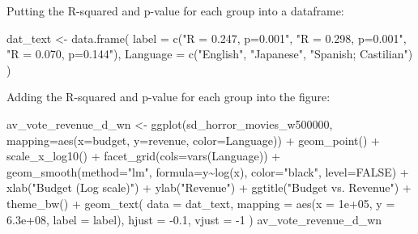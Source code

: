 \documentclass[
]{article}
\newenvironment{Shaded}{\begin{snugshade}}{\end{snugshade}}
\newcommand{\AttributeTok}[1]{\textcolor[rgb]{0.77,0.63,0.00}{#1}}
\newcommand{\ConstantTok}[1]{\textcolor[rgb]{0.00,0.00,0.00}{#1}}
\newcommand{\DecValTok}[1]{\textcolor[rgb]{0.00,0.00,0.81}{#1}}
\newcommand{\FloatTok}[1]{\textcolor[rgb]{0.00,0.00,0.81}{#1}}
\newcommand{\FunctionTok}[1]{\textcolor[rgb]{0.00,0.00,0.00}{#1}}
\newcommand{\NormalTok}[1]{#1}
\newcommand{\OtherTok}[1]{\textcolor[rgb]{0.56,0.35,0.01}{#1}}
\newcommand{\SpecialCharTok}[1]{\textcolor[rgb]{0.00,0.00,0.00}{#1}}
\newcommand{\StringTok}[1]{\textcolor[rgb]{0.31,0.60,0.02}{#1}}
\begin{document}
Putting the R-squared and p-value for each group into a dataframe:

\begin{Shaded}
\begin{Highlighting}[]
\NormalTok{dat\_text }\OtherTok{\textless{}{-}} \FunctionTok{data.frame}\NormalTok{(}
  \AttributeTok{label =} \FunctionTok{c}\NormalTok{(}\StringTok{"R = 0.247, p=0.001"}\NormalTok{, }\StringTok{"R = 0.298, p=0.001"}\NormalTok{, }\StringTok{"R = 0.070, p=0.144"}\NormalTok{),}
  \AttributeTok{Language   =} \FunctionTok{c}\NormalTok{(}\StringTok{"English"}\NormalTok{, }\StringTok{"Japanese"}\NormalTok{, }\StringTok{"Spanish; Castilian"}\NormalTok{)}
\NormalTok{)}
\end{Highlighting}
\end{Shaded}

Adding the R-squared and p-value for each group into the figure:

\begin{Shaded}
\begin{Highlighting}[]
\NormalTok{av\_vote\_revenue\_d\_wn }\OtherTok{\textless{}{-}} \FunctionTok{ggplot}\NormalTok{(sd\_horror\_movies\_w500000, }\AttributeTok{mapping=}\FunctionTok{aes}\NormalTok{(}\AttributeTok{x=}\NormalTok{budget, }\AttributeTok{y=}\NormalTok{revenue, }\AttributeTok{color=}\NormalTok{Language)) }\SpecialCharTok{+} \FunctionTok{geom\_point}\NormalTok{() }\SpecialCharTok{+} \FunctionTok{scale\_x\_log10}\NormalTok{() }\SpecialCharTok{+} \FunctionTok{facet\_grid}\NormalTok{(}\AttributeTok{cols=}\FunctionTok{vars}\NormalTok{(Language)) }\SpecialCharTok{+} \FunctionTok{geom\_smooth}\NormalTok{(}\AttributeTok{method=}\StringTok{"lm"}\NormalTok{, }\AttributeTok{formula=}\NormalTok{y}\SpecialCharTok{\textasciitilde{}}\FunctionTok{log}\NormalTok{(x), }\AttributeTok{color=}\StringTok{"black"}\NormalTok{, }\AttributeTok{level=}\ConstantTok{FALSE}\NormalTok{) }\SpecialCharTok{+} \FunctionTok{xlab}\NormalTok{(}\StringTok{"Budget (Log scale)"}\NormalTok{) }\SpecialCharTok{+} \FunctionTok{ylab}\NormalTok{(}\StringTok{"Revenue"}\NormalTok{) }\SpecialCharTok{+} \FunctionTok{ggtitle}\NormalTok{(}\StringTok{"Budget vs. Revenue"}\NormalTok{) }\SpecialCharTok{+} \FunctionTok{theme\_bw}\NormalTok{() }\SpecialCharTok{+} \FunctionTok{geom\_text}\NormalTok{(}
  \AttributeTok{data    =}\NormalTok{ dat\_text,}
  \AttributeTok{mapping =} \FunctionTok{aes}\NormalTok{(}\AttributeTok{x =} \FloatTok{1e+05}\NormalTok{, }\AttributeTok{y =} \FloatTok{6.3e+08}\NormalTok{, }\AttributeTok{label =}\NormalTok{ label),}
  \AttributeTok{hjust   =} \SpecialCharTok{{-}}\FloatTok{0.1}\NormalTok{,}
  \AttributeTok{vjust   =} \SpecialCharTok{{-}}\DecValTok{1}
\NormalTok{)}
\NormalTok{av\_vote\_revenue\_d\_wn }
\end{Highlighting}
\end{Shaded}
\end{document}

